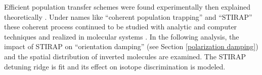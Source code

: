 Efficient population transfer schemes were found experimentally \cite{Gaubatza:1988a} then explained theoretically \cite{Kuklinski:1989a}. Under names like ``coherent population trapping'' and ``STIRAP'' \cite{Romanenko:1997a} these coherent process continued to be studied with analytic and computer techniques \cite{Choe:1997a,Bargatin:1999a,Kis:2002a} and realized in molecular systems \cite{Schiemann:1993a,Halfmann:1996a}. In the following analysis, the impact of STIRAP on ``orientation damping'' (see Section \ref{polarization damping}) and the spatial distribution of inverted molecules are examined. The STIRAP detuning ridge is fit and its effect on isotope discrimination is modeled.

